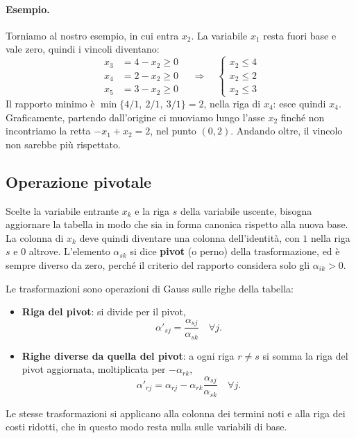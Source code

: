 \paragraph{Esempio.}
Torniamo al nostro esempio, in cui entra $x_2$. La variabile $x_1$ resta fuori base e vale zero, quindi i vincoli diventano:
\[
\begin{aligned}
x_3 &= 4 - x_2 \ge 0 \\
x_4 &= 2 - x_2 \ge 0 \\
x_5 &= 3 - x_2 \ge 0
\end{aligned}
\quad\Longrightarrow\quad
\begin{cases}
x_2 \le 4 \\
x_2 \le 2 \\
x_2 \le 3
\end{cases}
\]
Il rapporto minimo è $\min\{4/1,\ 2/1,\ 3/1\} = 2$, nella riga di $x_4$: esce quindi $x_4$. Graficamente, partendo dall'origine ci muoviamo lungo l'asse $x_2$ finché non incontriamo la retta $-x_1 + x_2 = 2$, nel punto $(0, 2)$. Andando oltre, il vincolo non sarebbe più rispettato.

\subsection{Operazione pivotale}
Scelte la variabile entrante $x_k$ e la riga $s$ della variabile uscente, bisogna aggiornare la tabella in modo che sia in forma canonica rispetto alla nuova base. La colonna di $x_k$ deve quindi diventare una colonna dell'identità, con $1$ nella riga $s$ e $0$ altrove. L'elemento $\alpha_{sk}$ si dice \textbf{pivot} (o perno) della trasformazione, ed è sempre diverso da zero, perché il criterio del rapporto considera solo gli $\alpha_{ik} > 0$.

Le trasformazioni sono operazioni di Gauss sulle righe della tabella:
\begin{itemize}
    \item \textbf{Riga del pivot}: si divide per il pivot,
    \[
    \alpha'_{sj} = \frac{\alpha_{sj}}{\alpha_{sk}} \quad \forall j.
    \]
    \item \textbf{Righe diverse da quella del pivot}: a ogni riga $r \neq s$ si somma la riga del pivot aggiornata, moltiplicata per $-\alpha_{rk}$,
    \[
    \alpha'_{rj} = \alpha_{rj} - \alpha_{rk} \frac{\alpha_{sj}}{\alpha_{sk}} \quad \forall j.
    \]
\end{itemize}
Le stesse trasformazioni si applicano alla colonna dei termini noti e alla riga dei costi ridotti, che in questo modo resta nulla sulle variabili di base.

